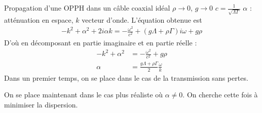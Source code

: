 \begin{solution}

\begin{questions}
    \questioncours Propagation d'une OPPH dans un câble coaxial idéal
    \question $\rho \rightarrow 0$, $g\rightarrow 0$
    \question $c = \frac{1}{\sqrt{\Lambda\Gamma}}$
    \question $\alpha$ : atténuation en espace, $k$ vecteur d'onde. L'équation obtenue est
    \begin{align*}
        -k^2 + \alpha^2 + 2i\alpha k = -\frac{\omega^2}{c^2} + (g\Lambda + \rho\Gamma) i \omega + g\rho
    \end{align*}
    D'où en décomposant en partie imaginaire et en partie réelle :
    \begin{align*}
        -k^2 + \alpha^2 &= -\frac{\omega^2}{c^2} + g\rho\\
        \alpha  &= \frac{g\Lambda + \rho\Gamma}{2} \frac{\omega}{k}
    \end{align*}
    \question Dans un premier temps, on se place dans le cas de la transmission sans pertes.
    \question On se place maintenant dans le cas plus réaliste où $\alpha \neq 0$. On cherche cette fois à minimiser la dispersion.
\end{questions}
\end{solution}
